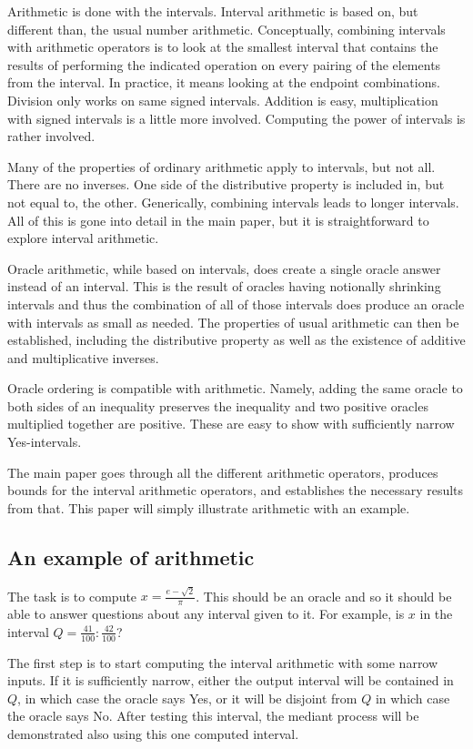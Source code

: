 \documentclass[12pt]{article}
\begin{document}
Arithmetic is done with the intervals. Interval arithmetic is based on, but different than, the usual number arithmetic. Conceptually, combining intervals with arithmetic operators is to look at the smallest interval that contains the results of performing the indicated operation on every pairing of the elements from the interval. In practice, it means looking at the endpoint combinations. Division only works on same signed intervals. Addition is easy, multiplication with signed intervals is a little more involved. Computing the power of intervals is rather involved. 


Many of the properties of ordinary arithmetic apply to intervals, but not all. There are no inverses. One side of the distributive property is included in, but not equal to, the other. Generically, combining intervals leads to longer intervals. All of this is gone into detail in the main paper, but it is straightforward to explore interval arithmetic. 

Oracle arithmetic, while based on intervals, does create a single oracle answer instead of an interval. This is the result of oracles having notionally shrinking intervals and thus the combination of all of those intervals does produce an oracle with intervals as small as needed. The properties of usual arithmetic can then be established, including the distributive property as well as the existence of additive and multiplicative inverses.   

Oracle ordering is compatible with arithmetic. Namely, adding the same oracle to both sides of an inequality preserves the inequality and two positive oracles multiplied together are positive. These are easy to show with sufficiently narrow Yes-intervals. 

The main paper goes through all the different arithmetic operators, produces bounds for the interval arithmetic operators, and establishes the necessary results from that. This paper will simply illustrate arithmetic with an example. 

\subsection{An example of arithmetic}

The task is to compute $x = \frac{e-\sqrt{2}}{\pi}$. This should be an oracle and so it should be able to answer questions about any interval given to it. For example, is $x$ in the interval $Q = \frac{41}{100}: \frac{42}{100}$? 

The first step is to start computing the interval arithmetic with some narrow inputs. If it is sufficiently narrow, either the output interval will be contained in $Q$, in which case the oracle says Yes, or it will be disjoint from $Q$ in which case the oracle says No. After testing this interval, the mediant process will be demonstrated also using this one computed interval. 
\end{document}
